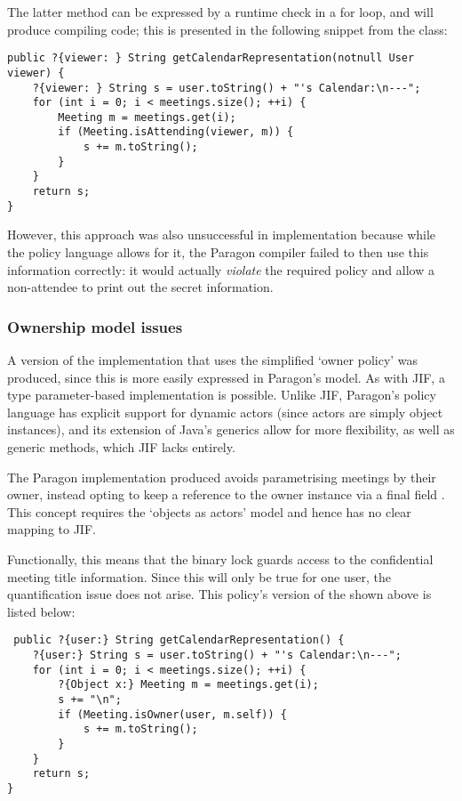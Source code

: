 The latter method can be expressed by a runtime check in a for loop, and will produce compiling code; this is presented in the following snippet from the  class:

\begin{verbatim}
public ?{viewer: } String getCalendarRepresentation(notnull User viewer) {
	?{viewer: } String s = user.toString() + "'s Calendar:\n---";
	for (int i = 0; i < meetings.size(); ++i) {
		Meeting m = meetings.get(i);
		if (Meeting.isAttending(viewer, m)) {
			s += m.toString();
		}
	}
	return s;
}
\end{verbatim}

However, this approach was also unsuccessful in implementation because while the policy language allows for it, the Paragon compiler failed to then use this information correctly: it would actually \textit{violate} the required policy and allow a non-attendee to print out the secret information.


\subsubsection{Ownership model issues}

A version of the implementation that uses the simplified `owner policy' was produced, since this is more easily expressed in Paragon's model. As with JIF, a type parameter-based implementation is possible. Unlike JIF, Paragon's policy language has explicit support for dynamic actors (since actors are simply object instances), and its extension of Java's generics allow for more flexibility, as well as generic methods, which JIF lacks entirely.

The Paragon implementation produced avoids parametrising meetings by their owner, instead opting to keep a reference to the owner instance via a final field . This concept requires the `objects as actors' model and hence has no clear mapping to JIF.

Functionally, this means that the binary lock  guards access to the confidential meeting title information. Since this will only be true for one user, the quantification issue does not arise. This policy's version of the  shown above is listed below:

\begin{verbatim}
 public ?{user:} String getCalendarRepresentation() {
	?{user:} String s = user.toString() + "'s Calendar:\n---";
	for (int i = 0; i < meetings.size(); ++i) {
		?{Object x:} Meeting m = meetings.get(i);
		s += "\n";
		if (Meeting.isOwner(user, m.self)) {
			s += m.toString();
		}
	}
	return s;
}
\end{verbatim}

